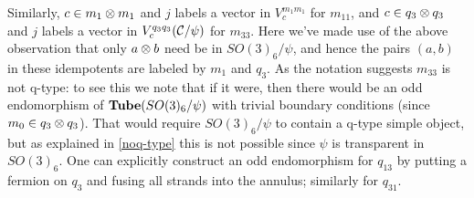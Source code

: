 Similarly, $c \in m_1 \otimes m_1$ and $j$ labels a vector in $V^{m_1 m_1}_c$ for $m_{11}$, 
and $c \in q_3 \otimes q_3$ and $j$ labels a vector in $V^{q_3 q_3}_c(\mathcal{C}/\psi)$ for $m_{33}$.
Here we've made use of the above observation that only $a \otimes b$ need be in $SO(3)_6/\psi$, 
and hence the pairs $(a,b)$ in these idempotents are labeled by $m_1$ and $q_3$.
As the notation suggests $m_{33}$ is not q-type:
 to see this we note that if it were, then there would 
be an odd endomorphism of $\textbf{Tube}(SO(3)_6/\psi)$ with trivial boundary conditions (since $m_0 \in q_3 \otimes q_3$).
That would require $SO(3)_6/\psi$ to contain a q-type simple object, 
but as explained in \eqref{noq-type} this is not possible since $\psi$ is transparent in $SO(3)_6$.
One can explicitly construct an odd endomorphism for $q_{13}$ by putting a fermion on $q_3$ and fusing all strands into the annulus;
similarly for $q_{31}$. 





